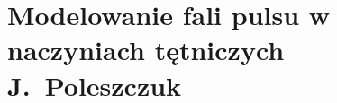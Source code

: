 \chapter[Modelowanie fali pulsu w naczyniach tętniczych]{Modelowanie fali pulsu w naczyniach tętniczych\\{\Large J.~Poleszczuk}}